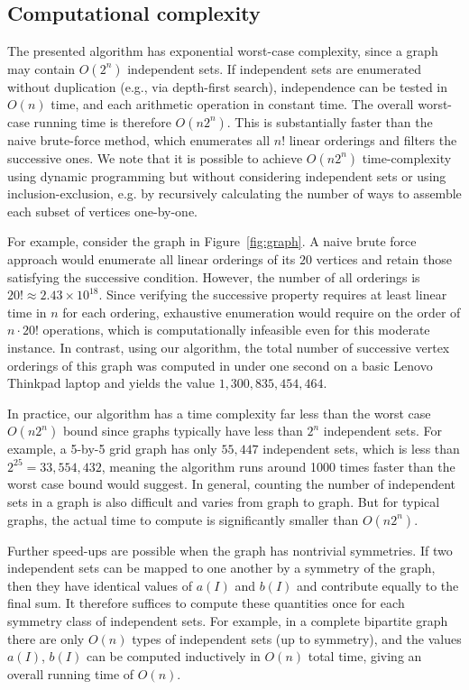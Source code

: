 \documentclass[11pt,a4paper]{article}
\numberwithin{equation}{section}
\theoremstyle{plain}
\theoremstyle{definition}
\theoremstyle{remark}
\begin{document}
\subsection{Computational complexity}

The presented algorithm has exponential worst-case complexity, since a graph may contain
\(O(2^n)\) independent sets. If independent sets are enumerated without duplication
(e.g., via depth-first search), independence can be tested in \(O(n)\) time, and each
arithmetic operation in constant time. The overall worst-case running time is therefore
\(O(n2^n)\). This is substantially faster than the naive brute-force method, which
enumerates all \(n!\) linear orderings and filters the successive ones. We note that it is possible to achieve $O(n2^n)$ time-complexity using dynamic programming but without considering independent sets or using inclusion-exclusion, e.g. by recursively calculating the number of ways to assemble each subset of vertices one-by-one. 

For example, consider the graph in Figure~\ref{fig:graph}. A naive brute force approach would enumerate all linear orderings of its $20$ vertices and retain those satisfying the successive condition. However, the number of all orderings is \(20! \approx 2.43 \times 10^{18}\). Since verifying the successive property requires at least linear time in $n$ for each ordering, exhaustive enumeration would require on the order of \(n \cdot 20!\) operations, which is computationally infeasible even for this moderate instance. In contrast, using our algorithm, the total number of successive vertex orderings of this graph was computed in under one second on a basic Lenovo Thinkpad laptop and yields the value \(1{,}300{,}835{,}454{,}464\).

In practice, our algorithm has a time complexity far less than the worst case $O(n2^n)$ bound since graphs typically have less than $2^n$ independent sets. For example, a 5-by-5 grid graph has only $55,447$ independent sets, which is less than $2^{25} = 33,554,432$, meaning the algorithm runs around 1000 times faster than the worst case bound would suggest. In general, counting the number of independent sets in a graph is also difficult and varies from graph to graph. But for typical graphs, the actual time to compute is significantly smaller than $O(n2^n)$. 

Further speed-ups are possible when the graph has nontrivial symmetries. If two independent sets can be mapped to one another by a symmetry of the graph, then they have identical values of \(a(I)\) and \(b(I)\) and contribute equally to the final sum. It therefore suffices to compute these quantities once for each symmetry class of independent sets. For example, in a complete bipartite graph there are only $O(n)$ types of independent sets (up to symmetry), and the values $a(I)$, $b(I)$ can be computed inductively in $O(n)$ total time, giving an overall running time of $O(n)$. 
\end{document}
